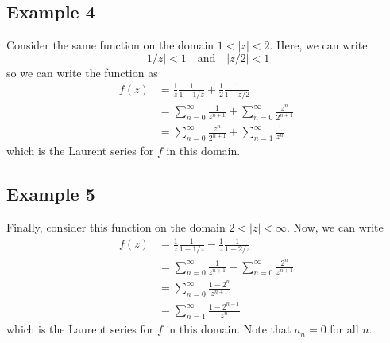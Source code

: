 \documentclass{article}
\begin{document}
\subsection{Example 4}
Consider the same function on the domain $1 < |z| < 2$. Here, we can write
\[
	|1/z| < 1 \quad \text{and} \quad |z/2| < 1
\]
so we can write the function as
\begin{align*}
	f(z)
	&= \frac{1}{z} \frac{1}{1 - 1/z} + \frac{1}{2} \frac{1}{1 - z/2} \\
	&= \sum_{n=0}^\infty \frac{1}{z^{n+1}} + \sum_{n=0}^\infty \frac{z^n}{2^{n+1}} \\
	&= \sum_{n=0}^\infty \frac{z^n}{2^{n+1}} + \sum_{n=1}^\infty \frac{1}{z^n}
\end{align*}
which is the Laurent series for $f$ in this domain.

\subsection{Example 5}
Finally, consider this function on the domain $2 < |z| < \infty$. Now, we can write
\begin{align*}
	f(z)
	&= \frac{1}{z} \frac{1}{1 - 1/z} - \frac{1}{z} \frac{1}{1 - 2/z} \\
	&= \sum_{n=0}^\infty \frac{1}{z^{n+1}} - \sum_{n=0}^\infty \frac{2^n}{z^{n+1}} \\
	&= \sum_{n=0}^\infty \frac{1 - 2^n}{z^{n+1}} \\
	&= \sum_{n=1}^\infty \frac{1 - 2^{n-1}}{z^n}
\end{align*}
which is the Laurent series for $f$ in this domain. Note that $a_n = 0$ for all $n$.
\end{document}
